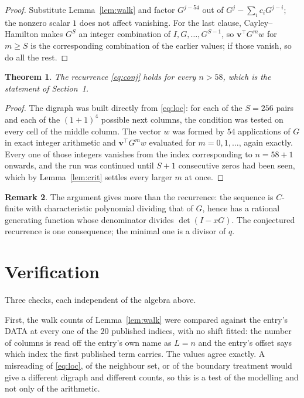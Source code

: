 \documentclass[11pt,a4paper]{article}
\theoremstyle{plain}
\newtheorem{theorem}{Theorem}
\theoremstyle{definition}
\newtheorem{remark}[theorem]{Remark}
\begin{document}
\begin{proof}
Substitute Lemma~\ref{lem:walk} and factor $G^{j-54}$ out of
$G^{j}-\sum_ic_iG^{j-i}$; the nonzero scalar $1$ does not affect
vanishing. For the last clause, Cayley--Hamilton makes $G^{S}$ an integer combination of
$I,G,\dots,G^{S-1}$, so $\mathbf{v}^{\!\top}G^{m}w$ for $m\ge S$ is the corresponding
combination of the earlier values; if those vanish, so do all the rest.
\end{proof}

\begin{theorem}
The recurrence \eqref{eq:conj} holds for every $n>58$, which is the statement of
Section~1.
\end{theorem}

\begin{proof}
The digraph was built directly from \eqref{eq:loc}: for each of the $S=256$ pairs and each
of the $(1+1)^{4}$ possible next columns, the condition was tested on every cell of
the middle column. The vector $w$ was formed by $54$ applications of $G$ in exact integer
arithmetic and $\mathbf{v}^{\!\top}G^{m}w$ evaluated for $m=0,1,\dots$, again exactly.
Every one of those integers vanishes from the index corresponding to $n=58+1$ onwards,
and the run was continued until $S+1$ consecutive zeros had been seen, which by
Lemma~\ref{lem:crit} settles every larger $m$ at once.
\end{proof}

\begin{remark}
The argument gives more than the recurrence: the sequence is $C$-finite with characteristic
polynomial dividing that of $G$, hence has a rational generating function whose denominator
divides $\det(I-xG)$. The conjectured recurrence is one consequence; the minimal one is a
divisor of $q$.
\end{remark}

\section{Verification}

Three checks, each independent of the algebra above.

First, the walk counts of Lemma~\ref{lem:walk} were compared against the entry's DATA at
every one of the $20$ published indices, with no shift fitted: the number of columns is
read off the entry's own name as $L=n$ and the entry's offset says which index the first
published term carries. The values agree exactly. A misreading of \eqref{eq:loc}, of the
neighbour set, or of the boundary treatment would give a different digraph and different
counts, so this is a test of the modelling and not only of the arithmetic.
\end{document}
